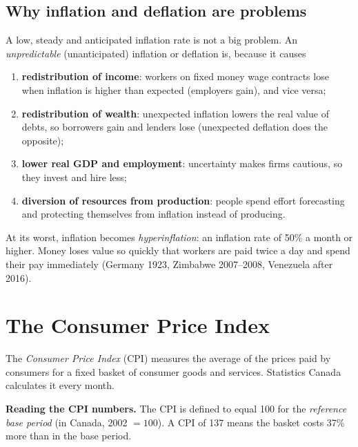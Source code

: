 \subsection{Why inflation and deflation are problems}

A low, steady and anticipated inflation rate is not a big problem. An
\emph{unpredictable} (unanticipated) inflation or deflation is, because it causes
\begin{enumerate}
  \item \textbf{redistribution of income}: workers on fixed money wage contracts lose
        when inflation is higher than expected (employers gain), and vice versa;
  \item \textbf{redistribution of wealth}: unexpected inflation lowers the real value of
        debts, so borrowers gain and lenders lose (unexpected deflation does the
        opposite);
  \item \textbf{lower real GDP and employment}: uncertainty makes firms cautious, so they
        invest and hire less;
  \item \textbf{diversion of resources from production}: people spend effort forecasting
        and protecting themselves from inflation instead of producing.
\end{enumerate}

\begin{definition}[Hyperinflation]
At its worst, inflation becomes \emph{hyperinflation}: an inflation rate of 50\% a month
or higher. Money loses value so quickly that workers are paid twice a day and spend their
pay immediately (Germany 1923, Zimbabwe 2007--2008, Venezuela after 2016).
\end{definition}

\section{The Consumer Price Index}

\begin{definition}[CPI]
The \emph{Consumer Price Index} (CPI) measures the average of the prices paid by
consumers for a fixed basket of consumer goods and services. Statistics Canada calculates
it every month.
\end{definition}

\textbf{Reading the CPI numbers.} The CPI is defined to equal 100 for the
\emph{reference base period} (in Canada, 2002 $= 100$). A CPI of 137 means the basket costs
37\% more than in the base period.

